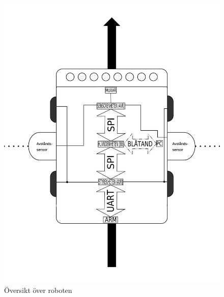 \begin{figure}[h!]
\center
\includegraphics[scale=0.32]{grafik/oversikt-robot}
\caption{Översikt över roboten} \label{designspec:robot}
\end{figure}
